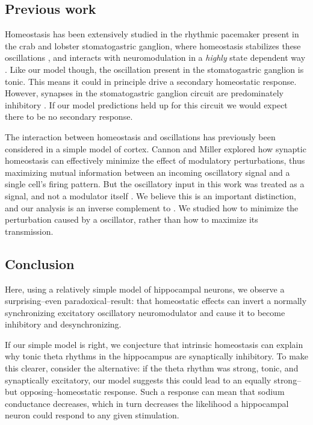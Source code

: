 \documentclass{article}
\begin{document}
\subsection*{Previous work}
Homeostasis has been extensively studied in the rhythmic pacemaker present in the crab and lobster stomatogastric ganglion, where homeostasis stabilizes these oscillations \cite{Golowasch1999}, and interacts with neuromodulation in a \textit{highly} state dependent way \cite{Marder2014,Marder2015,Marder2014}. Like our model though, the oscillation present in the stomatogastric ganglion is tonic. This means it could in principle drive a secondary homeostatic response. However, synapses in the stomatogastric ganglion circuit are predominately inhibitory \cite{Marder2015}. If our model predictions held up for this circuit we would expect there to be no secondary response.

The interaction between homeostasis and oscillations has previously been considered in a simple model of cortex. Cannon and Miller \citep{Cannon2017} explored how synaptic homeostasis can effectively minimize the effect of modulatory perturbations, thus maximizing mutual information between an incoming oscillatory signal and a single cell's firing pattern. But the oscillatory input in this work was treated as a signal, and not a modulator itself \citep{Cannon2017}. We believe this is an important distinction, and our analysis is an inverse complement to \citep{Cannon2017}. We studied how to minimize the perturbation caused by a oscillator, rather than how to maximize its transmission.

\subsection*{Conclusion}
 Here, using a relatively simple model of hippocampal neurons, we observe a surprising--even paradoxical--result: that homeostatic effects can invert a normally synchronizing excitatory oscillatory neuromodulator and cause it to become inhibitory and desynchronizing.
 
 If our simple model is right, we conjecture that intrinsic homeostasis can explain why tonic theta rhythms in the hippocampus are synaptically inhibitory. To make this clearer, consider the alternative: if the theta rhythm was strong, tonic, and synaptically excitatory, our model suggests this could lead to an equally strong--but opposing--homeostatic response. Such a response can mean that sodium conductance decreases, which in turn decreases the likelihood a hippocampal neuron could respond to any given stimulation. 
\end{document}
